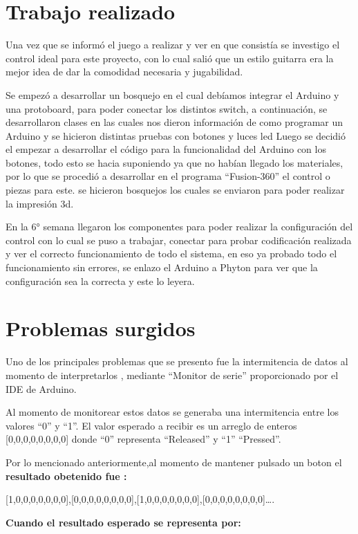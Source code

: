 \documentclass[12pt]{article}
\begin{document}
\section{Trabajo realizado}
    Una vez que se informó el juego a realizar y ver en que consistía se investigo el control ideal para este proyecto, con lo cual salió que un estilo guitarra era la mejor idea de dar la comodidad necesaria y jugabilidad.
    
Se empezó a desarrollar un bosquejo en el cual debíamos integrar el Arduino y una protoboard, para poder conectar los distintos switch, a continuación, se desarrollaron clases en las cuales nos dieron información de como programar un Arduino y se hicieron distintas pruebas con botones y luces led 
Luego se decidió el empezar a desarrollar el código para la funcionalidad del Arduino con los botones, todo esto se hacia suponiendo ya que no habían llegado los materiales, por lo que se procedió a desarrollar en el programa “Fusion-360” el control o piezas para este. se hicieron bosquejos los cuales se enviaron para poder realizar la impresión 3d. 

En la 6° semana llegaron los componentes para poder realizar la configuración del control con lo cual se puso a trabajar, conectar para probar codificación realizada y ver el correcto funcionamiento de todo el sistema, en eso ya probado todo el funcionamiento sin errores, se enlazo el Arduino a Phyton para ver que la configuración sea la correcta y este lo leyera.
    \newpage

\section{Problemas surgidos}
    Uno de los principales problemas que se presento fue la intermitencia de datos al momento de interpretarlos , mediante “Monitor de serie” proporcionado por el IDE de Arduino.
    
Al momento de monitorear estos datos se generaba una intermitencia entre los valores “0” y “1”.
El valor esperado a recibir es un arreglo de enteros [0,0,0,0,0,0,0,0] donde “0” representa “Released” y “1” “Pressed”.


 Por lo mencionado anteriormente,al momento de mantener pulsado un boton el\textbf{    resultado obetenido fue :}
 
[1,0,0,0,0,0,0,0],[0,0,0,0,0,0,0,0],[1,0,0,0,0,0,0,0],[0,0,0,0,0,0,0,0]….

\textbf{Cuando el resultado esperado se representa por:}
\end{document}
